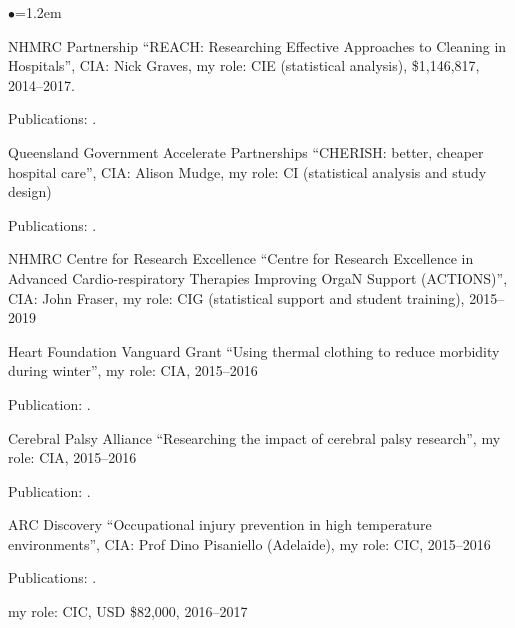 \documentclass[a4paper,11pt]{article}
\renewcommand{\labelitemi}{$\bullet$}
\begin{document}
\begin{raggedright}
\begin{list}{\labelitemi}{\leftmargin=1.2em}
\item NHMRC Partnership ``REACH: Researching Effective Approaches to Cleaning in Hospitals'', CIA: Nick Graves, my role: CIE (statistical analysis), \$1,146,817, 2014--2017.

    Publications: .

\item Queensland Government Accelerate Partnerships ``CHERISH: better, cheaper hospital care'', CIA: Alison Mudge, my role: CI (statistical analysis and study design) %

    Publications: .

\item NHMRC Centre for Research Excellence ``Centre for Research Excellence in Advanced Cardio-respiratory Therapies Improving OrgaN Support (ACTIONS)'', CIA: John Fraser, my role: CIG (statistical support and student training), 2015--2019

\item Heart Foundation Vanguard Grant ``Using thermal clothing to reduce morbidity during winter'', my role: CIA, 2015--2016

   Publication: .

\item Cerebral Palsy Alliance ``Researching the impact of cerebral palsy research'', my role: CIA, 2015--2016

   Publication: .

\item ARC Discovery ``Occupational injury prevention in high temperature environments'', CIA: Prof Dino Pisaniello (Adelaide), my role: CIC, 2015--2016

   Publications: .

my role: CIC, USD \$82,000, 2016--2017


\end{list}
\end{raggedright}
\end{document}
